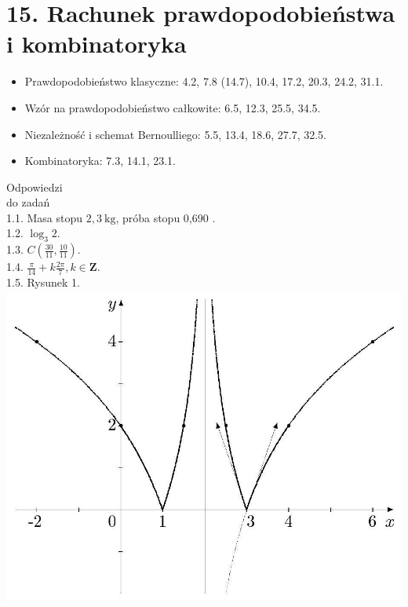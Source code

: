 \documentclass[10pt]{article}
\begin{document}
\section*{15. Rachunek prawdopodobieństwa i kombinatoryka}
\begin{itemize}
  \item Prawdopodobieństwo klasyczne: 4.2, 7.8 (14.7), 10.4, 17.2, 20.3, 24.2, 31.1.
  \item Wzór na prawdopodobieństwo całkowite: 6.5, 12.3, 25.5, 34.5.
  \item Niezależność i schemat Bernoulliego: 5.5, 13.4, 18.6, 27.7, 32.5.
  \item Kombinatoryka: 7.3, 14.1, 23.1.
\end{itemize}

Odpowiedzi\\
do zadań\\
1.1. Masa stopu $2,3 \mathrm{~kg}$, próba stopu 0,690 .\\
1.2. $\log _{3} 2$.\\
1.3. $C\left(\frac{30}{11}, \frac{10}{11}\right)$.\\
1.4. $\frac{\pi}{14}+k \frac{2 \pi}{7}, k \in \mathbf{Z}$.\\
1.5. Rysunek 1.\\
\includegraphics[max width=\textwidth, center]{2024_11_16_fe5b564401bf7db98894g-052}
\end{document}
